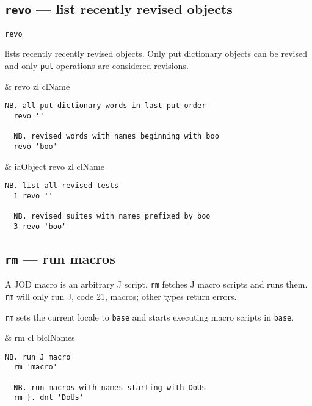 \subsection{\texttt{revo} --- list recently revised objects} 

\hypertarget{il:revo}{\texttt{revo}} lists recently recently revised objects. 
Only put dictionary objects can be revised and only 
\hyperlink{il:put}{\texttt{put}} operations are considered revisions. 

\begin{wordhead}
\monad & revo zl \argsep clName \\
\end{wordhead}
\begin{lstlisting}[frame=single,framerule=0pt] 
  NB. all put dictionary words in last put order
  revo ''   
    
  NB. revised words with names beginning with boo  
  revo 'boo'  
\end{lstlisting}  

\begin{wordhead}
\dyad & iaObject revo zl \argsep clName \\
\end{wordhead}
\begin{lstlisting}[frame=single,framerule=0pt] 
  NB. list all revised tests
  1 revo ''  
  
  NB. revised suites with names prefixed by boo 
  3 revo 'boo'  
\end{lstlisting}                  


\subsection{\texttt{rm} --- run macros}\label{ss:rm}
 
A JOD macro is an arbitrary J script.  \hypertarget{il:rm}{\texttt{rm}} 
fetches J macro scripts and runs them. \texttt{rm} will only run J, code 21, macros; other types return errors.  

\texttt{rm} sets the current locale to \texttt{base} and starts 
executing macro scripts in \texttt{base}. 

\begin{wordhead}
\monad & rm cl \argsep blclNames \\
\end{wordhead}
\begin{lstlisting}[frame=single,framerule=0pt] 
  NB. run J macro 
  rm 'macro' 

  NB. run macros with names starting with DoUs
  rm }. dnl 'DoUs' 
\end{lstlisting}   

